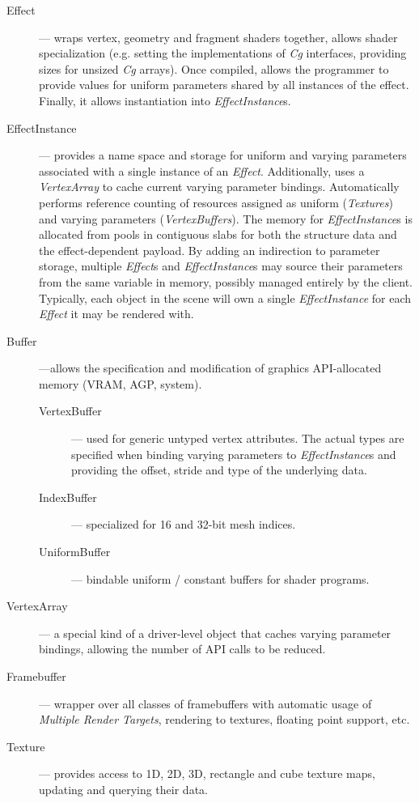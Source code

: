 \begin{description}

\item[Effect] --- wraps vertex, geometry and fragment shaders together, allows shader specialization (e.g. setting the implementations of \emph{Cg} interfaces, providing sizes for unsized \emph{Cg} arrays). Once compiled, allows the programmer to provide values for uniform parameters shared by all instances of the effect. Finally, it allows instantiation into \emph{EffectInstance}s.

\item[EffectInstance] --- provides a name space and storage for uniform and varying parameters associated with a single instance of an \emph{Effect}. Additionally, uses a \emph{VertexArray} to cache current varying parameter bindings. Automatically performs reference counting of resources assigned as uniform (\emph{Textures}) and varying parameters (\emph{VertexBuffers}). The memory for \emph{EffectInstance}s is allocated from pools in contiguous slabs for both the structure data and the effect-dependent payload. By adding an indirection to parameter storage, multiple \emph{Effect}s and \emph{EffectInstance}s may source their parameters from the same variable in memory, possibly managed entirely by the client. Typically, each object in the scene will own a single \emph{EffectInstance} for each \emph{Effect} it may be rendered with.

\item[Buffer] ---allows the specification and modification of graphics API-allocated memory (VRAM, AGP, system).

\begin{description}
\item[VertexBuffer] --- used for generic untyped vertex attributes. The actual types are specified when binding varying parameters to \emph{EffectInstance}s and providing the offset, stride and type of the underlying data.
\item[IndexBuffer] --- specialized for 16 and 32-bit mesh indices.
\item[UniformBuffer] --- bindable uniform / constant buffers for shader programs.
\end{description}

\item[VertexArray] --- a special kind of a driver-level object that caches varying parameter bindings, allowing the number of API calls to be reduced.

\item[Framebuffer] --- wrapper over all classes of framebuffers with automatic usage of \emph{Multiple Render Targets}, rendering to textures, floating point support, etc.

\item[Texture] --- provides access to 1D, 2D, 3D, rectangle and cube texture maps, updating and querying their data.
\end{description}

